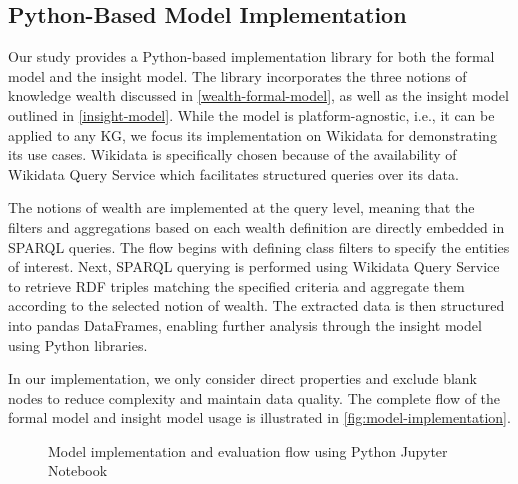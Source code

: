 \subsection{Python-Based Model Implementation}

Our study provides a Python-based implementation library for both the formal model and the insight model. The library incorporates the three notions of knowledge wealth discussed in \autoref{wealth-formal-model}, as well as the insight model outlined in \autoref{insight-model}. While the model is platform-agnostic, i.e., it can be applied to any KG, we focus its implementation on Wikidata for demonstrating its use cases. Wikidata is specifically chosen because of the availability of Wikidata Query Service which  facilitates structured queries over its data.

The notions of wealth are implemented at the query level, meaning that the filters and aggregations based on each wealth definition are directly embedded in SPARQL queries. The flow begins with defining class filters to specify the entities of interest. Next, SPARQL querying is performed using Wikidata Query Service to retrieve RDF triples matching the specified criteria and aggregate them according to the selected notion of wealth. The extracted data is then structured into pandas DataFrames, enabling further analysis through the insight model using Python libraries.

In our implementation, we only consider direct properties and exclude blank nodes to reduce complexity and maintain data quality. The complete flow of the formal model and insight model usage is illustrated in \autoref{fig:model-implementation}.

\begin{figure}[!htbp]
    \centering
    \caption{Model implementation and evaluation flow using Python Jupyter Notebook} \label{fig:model-implementation}
\end{figure}